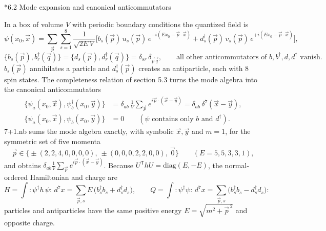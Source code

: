 \documentclass[10pt,a4paper]{article}
\makeatletter
\renewcommand\subsection{\@startsection{subsection}{2}{\z@}{-3.25ex\@plus -1ex \@minus -.2ex}{1.5ex \@plus .2ex}{\normalfont\large\bfseries\raggedright}}
\makeatother
\begin{document}
\subsection*{6.2 Mode expansion and canonical anticommutators}
In a box of volume $V$ with periodic boundary conditions the quantized field is
\begin{equation*}
\psi(x_0,\vec x)=\sum_{\vec p}\sum_{s=1}^{8}\frac{1}{\sqrt{2E\,V}}\Big[b_s(\vec p)\,u_s(\vec p)\,e^{-i(Ex_0-\vec p\cdot\vec x)}+d_s^\dagger(\vec p)\,v_s(\vec p)\,e^{+i(Ex_0-\vec p\cdot\vec x)}\Big],
\end{equation*}
\begin{equation*}
\big\lbrace b_s(\vec p),b_r^\dagger(\vec q)\big\rbrace=\big\lbrace d_s(\vec p),d_r^\dagger(\vec q)\big\rbrace=\delta_{sr}\,\delta_{\vec p\vec q},\qquad\text{all other anticommutators of }b,b^\dagger,d,d^\dagger\text{ vanish}.
\end{equation*}
$b_s(\vec p)$ annihilates a particle and $d_s^\dagger(\vec p)$ creates an antiparticle, each with 8 spin states. The completeness relation of section 5.3 turns the mode algebra into the canonical anticommutators
\begin{align*}
\big\lbrace\psi_a(x_0,\vec x),\psi_b^\dagger(x_0,\vec y)\big\rbrace&=\delta_{ab}\,\frac1V\sum_{\vec p}e^{i\vec p\cdot(\vec x-\vec y)}=\delta_{ab}\,\delta^7(\vec x-\vec y), \\
\big\lbrace\psi_a(x_0,\vec x),\psi_b(x_0,\vec y)\big\rbrace&=0\qquad(\psi\text{ contains only }b\text{ and }d^\dagger).
\end{align*}
7+1.nb sums the mode algebra exactly, with symbolic $\vec x,\vec y$ and $m=1$, for the symmetric set of five momenta
\begin{equation*}
\vec p\in\big\{\pm(2,2,4,0,0,0,0),\ \pm(0,0,0,2,2,0,0),\ \vec 0\big\}\qquad(E=5,5,3,3,1),
\end{equation*}
and obtains $\delta_{ab}\frac1V\sum_{\vec p}e^{i\vec p\cdot(\vec x-\vec y)}$. Because $U^{\mathsf T}hU=\mathrm{diag}(E,-E)$, the normal-ordered Hamiltonian and charge are
\begin{equation*}
H=\int:\psi^\dagger h\,\psi:\,d^7x=\sum_{\vec p,s}E\,\big(b_s^\dagger b_s+d_s^\dagger d_s\big),\qquad Q=\int:\psi^\dagger\psi:\,d^7x=\sum_{\vec p,s}\big(b_s^\dagger b_s-d_s^\dagger d_s\big):
\end{equation*}
particles and antiparticles have the same positive energy $E=\sqrt{m^2+\vec p^{\,2}}$ and opposite charge.
\end{document}

